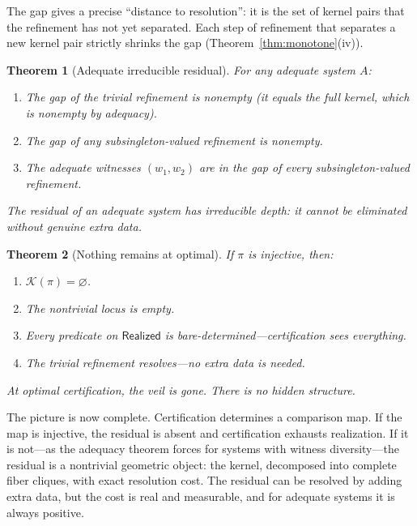 \documentclass[11pt,a4paper]{article}
\theoremstyle{plain}
\newtheorem{theorem}{Theorem}[section]
\theoremstyle{definition}
\theoremstyle{remark}
\newcommand{\Real}{\mathsf{Realized}}
\newcommand{\compare}{\pi}
\newcommand{\Ker}{\mathcal{K}}
\begin{document}
The gap gives a precise ``distance to resolution'': it is the set of kernel
pairs that the refinement has not yet separated. Each step of refinement
that separates a new kernel pair strictly shrinks the gap
(Theorem~\ref{thm:monotone}(iv)).

\begin{theorem}[Adequate irreducible residual]\label{thm:adequate-irred}
For any adequate system $A$:
\begin{enumerate}[label=(\roman*),nosep]
\item The gap of the trivial refinement is nonempty (it equals the full
      kernel, which is nonempty by adequacy).
\item The gap of any subsingleton-valued refinement is nonempty.
\item The adequate witnesses $(w_1, w_2)$ are in the gap of every
      subsingleton-valued refinement.
\end{enumerate}
The residual of an adequate system has irreducible depth: it cannot be
eliminated without genuine extra data.
\end{theorem}

\begin{theorem}[Nothing remains at optimal]\label{thm:nothing-remains}
If $\compare$ is injective, then:
\begin{enumerate}[label=(\roman*),nosep]
\item $\Ker(\compare) = \varnothing$.
\item The nontrivial locus is empty.
\item Every predicate on $\Real$ is bare-determined---certification sees
      everything.
\item The trivial refinement resolves---no extra data is needed.
\end{enumerate}
At optimal certification, the veil is gone. There is no hidden structure.
\end{theorem}

The picture is now complete. Certification determines a comparison map.
If the map is injective, the residual is absent and certification exhausts
realization. If it is not---as the adequacy theorem forces for systems with
witness diversity---the residual is a nontrivial geometric object: the kernel,
decomposed into complete fiber cliques, with exact resolution cost. The
residual can be resolved by adding extra data, but the cost is real and
measurable, and for adequate systems it is always positive.
\end{document}

